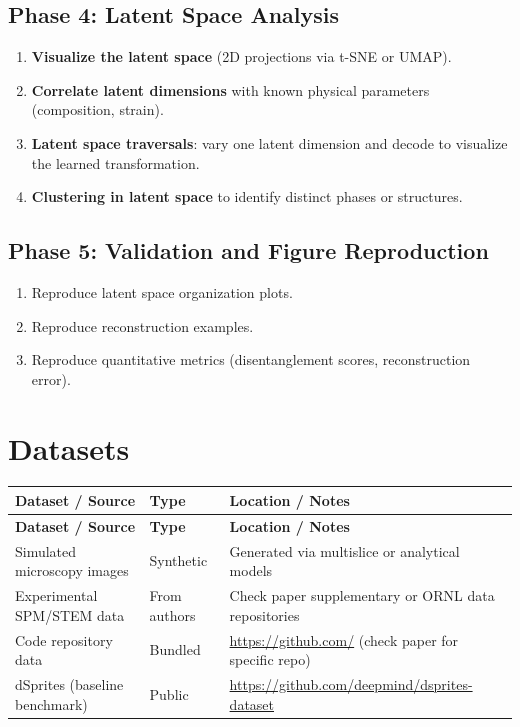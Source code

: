 \documentclass[11pt,a4paper]{article}
\begin{document}
\subsection{Phase 4: Latent Space Analysis}
\begin{enumerate}[label=\textbf{4.\arabic*}]
  \item \textbf{Visualize the latent space} (2D projections via t-SNE or UMAP).
  \item \textbf{Correlate latent dimensions} with known physical parameters (composition, strain).
  \item \textbf{Latent space traversals}: vary one latent dimension and decode to visualize the learned transformation.
  \item \textbf{Clustering in latent space} to identify distinct phases or structures.
\end{enumerate}

\subsection{Phase 5: Validation and Figure Reproduction}
\begin{enumerate}[label=\textbf{5.\arabic*}]
  \item Reproduce latent space organization plots.
  \item Reproduce reconstruction examples.
  \item Reproduce quantitative metrics (disentanglement scores, reconstruction error).
\end{enumerate}

\section{Datasets}

\begin{longtable}{p{4.5cm} p{3.5cm} p{6cm}}
\toprule
\textbf{Dataset / Source} & \textbf{Type} & \textbf{Location / Notes} \\
\midrule
\endfirsthead
\toprule
\textbf{Dataset / Source} & \textbf{Type} & \textbf{Location / Notes} \\
\midrule
\endhead
Simulated microscopy images & Synthetic & Generated via multislice or analytical models \\
\midrule
Experimental SPM/STEM data & From authors & Check paper supplementary or ORNL data repositories \\
\midrule
Code repository data & Bundled & \url{https://github.com/} (check paper for specific repo) \\
\midrule
dSprites (baseline benchmark) & Public & \url{https://github.com/deepmind/dsprites-dataset} \\
\bottomrule
\end{longtable}
\end{document}
